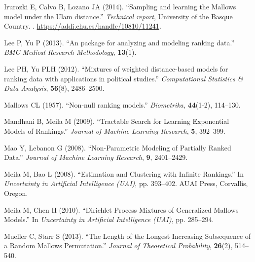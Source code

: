 \documentclass[article,nojss]{jss}
\begin{document}
\begin{thebibliography}{44}
Irurozki E, Calvo B, Lozano JA (2014{}).
\newblock \enquote{{Sampling and learning the Mallows model under the Ulam
  distance}.}
\newblock \emph{Technical report}, University of the Basque Country.
\newblock {}.
\newblock \urlprefix\url{https://addi.ehu.es/handle/10810/11241}.

Lee P, Yu P (2013).
\newblock \enquote{{An  package for analyzing and
  modeling ranking data}.}
\newblock \emph{BMC Medical Research Methodology}, \textbf{13}(1).

Lee PH, Yu PLH (2012).
\newblock \enquote{{Mixtures of weighted distance-based models for ranking data
  with applications in political studies}.}
\newblock \emph{Computational Statistics \& Data Analysis}, \textbf{56}(8),
  2486--2500.

Mallows CL (1957).
\newblock \enquote{{Non-null ranking models}.}
\newblock \emph{Biometrika}, \textbf{44}(1-2), 114--130.

Mandhani B, Meila M (2009).
\newblock \enquote{{Tractable Search for Learning Exponential Models of
  Rankings}.}
\newblock \emph{Journal of Machine Learning Research}, \textbf{5}, 392--399.

Mao Y, Lebanon G (2008).
\newblock \enquote{{Non-Parametric Modeling of Partially Ranked Data}.}
\newblock \emph{Journal of Machine Learning Research}, \textbf{9}, 2401--2429.

Meila M, Bao L (2008).
\newblock \enquote{{Estimation and Clustering with Infinite Rankings}.}
\newblock In \emph{Uncertainty in Artificial Intelligence (UAI)}, pp. 393--402.
  AUAI Press, Corvallis, Oregon.

Meila M, Chen H (2010).
\newblock \enquote{{Dirichlet Process Mixtures of Generalized Mallows Models}.}
\newblock In \emph{Uncertainty in Artificial Intelligence (UAI)}, pp. 285--294.

Mueller C, Starr S (2013).
\newblock \enquote{{The Length of the Longest Increasing Subsequence of a
  Random Mallows Permutation}.}
\newblock \emph{Journal of Theoretical Probability}, \textbf{26}(2), 514--540.


\end{thebibliography}
\end{document}
